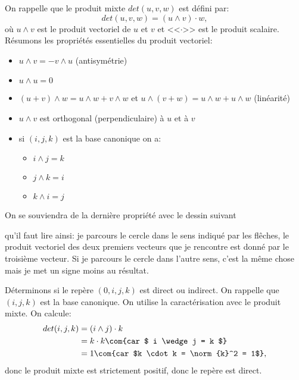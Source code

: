 \documentclass[12pt, a4paper,oneside]{article} %
\begin{document}
On rappelle que le produit
mixte $ det(u,v,w) $
est défini par:
\begin{equation}
	det(u,v,w)
	=
	(u \wedge v) \cdot w
	,
\end{equation}
où $ u \wedge v $ est le produit vectoriel
de $ u $ et $ v $
et <<$\cdot$>> est le produit scalaire.
Résumons les propriétés essentielles
du produit vectoriel:
\begin{itemize}
	\item $ u \wedge v = - v \wedge u $
		(antisymétrie)
	\item $ u \wedge u = 0 $ 
	\item $ (u + v) \wedge w = u \wedge w + v \wedge w $ 
		et
		$ u \wedge (v + w) = u \wedge w + u \wedge w $ 
		(linéarité)
	\item $ u \wedge v $ est orthogonal (perpendiculaire) à
		$ u $ et à $ v $
	\item si $ (i,j,k) $ est la base canonique on a:
		\begin{itemize}
			\item $ i \wedge j = k $
			\item $ j \wedge k = i $
			\item $ k \wedge i = j $ 
		\end{itemize}
\end{itemize}
On se souviendra de la dernière propriété
avec le dessin suivant

qu'il faut lire ainsi:
je parcours le cercle dans le sens indiqué
par les flêches,
le produit vectoriel des deux premiers
vecteurs que je rencontre est donné
par le troisième vecteur.
Si je parcours le cercle dans l'autre sens,
c'est la même chose mais je met un signe moins
au résultat.

Déterminons si le repère
$ (0, i, j, k) $
est direct ou indirect.
On rappelle que $ (i,j,k) $
est la base canonique.
On utilise la caractérisation avec le produit mixte.
On calcule:
\begin{align}
	det(i, j, k)
	& =
	(i \wedge j) \cdot k
	\\
	&=
	k \cdot k \com{car $ i \wedge j = k $}
	\\
	& =
	1 \com{car $k \cdot k = \norm{k}^2 = 1$}
	,
\end{align}
donc le produit mixte
est strictement positif,
donc le repère est direct.
\end{document}
